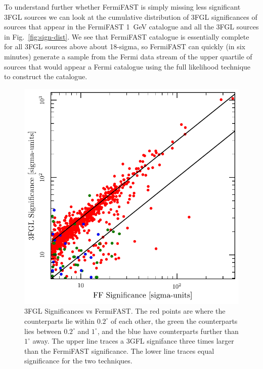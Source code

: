 \documentclass[useAMS,usenatbib]{mn2e}
\begin{document}
To understand further whether FermiFAST is simply missing less
significant 3FGL sources we can look at the cumulative distribution of
3FGL significances of sources that appear in the FermiFAST 1~GeV
catalogue and all the 3FGL sources in Fig.~\ref{fig:sign-dist}.  We
see that FermiFAST catalogue is essentially complete for all 3FGL
sources above about 18-sigma, so FermiFAST can quickly (in six minutes)
generate a sample from the Fermi data stream of the upper quartile of
sources that would appear a Fermi catalogue using the full likelihood
technique to construct the catalogue.
\begin{figure}
\includegraphics[width=\columnwidth]{sign-comp}
\caption{3FGL Significances vs FermiFAST.  The red points are where
  the counterparts lie within $0.2^\circ$ of each other, the green the
  counterparts lies between $0.2^\circ$ and $1^\circ$, and the blue
  have counterparts further than $1^\circ$ away. The upper line traces
  a 3GFL signifance three times larger than the FermiFAST
  significance.  The lower line traces equal significance for the two techniques.
}
\label{fig:fermi_comp}
\end{figure}
\end{document}

